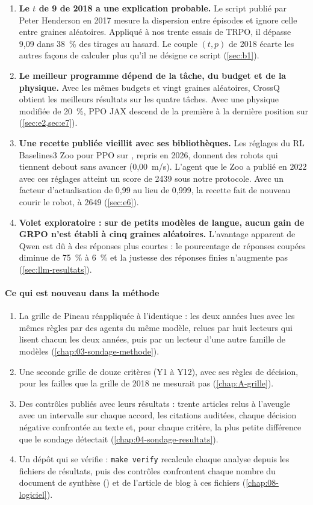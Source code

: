 \begin{enumerate}
  (\cref{sec:e1,sec:e4}).
  \item \textbf{Le $t$ de 9 de 2018 a une explication probable.} Le script publié par Peter Henderson
  en 2017 mesure la dispersion entre épisodes et ignore celle entre graines aléatoires. Appliqué à nos
  trente essais de TRPO, il dépasse 9,09 dans 38~\% des tirages au hasard. Le couple $(t, p)$ de 2018
  écarte les autres façons de calculer plus qu'il ne désigne ce script (\cref{sec:b1}).
  \item \textbf{Le meilleur programme dépend de la tâche, du budget et de la physique.} Avec les mêmes
  budgets et vingt graines aléatoires, CrossQ obtient les meilleurs résultats sur les quatre
  tâches. Avec une physique modifiée de 20~\%, PPO JAX descend de la première à la dernière
  position sur  (\cref{sec:e2,sec:e7}).
  \item \textbf{Une recette publiée vieillit avec ses bibliothèques.} Les réglages du RL Baselines3
  Zoo pour PPO sur , repris en 2026, donnent des robots qui tiennent debout sans avancer
  (0,00~m/s). L'agent que le Zoo a publié en 2022 avec ces réglages atteint un score de \num{2439}
  sous notre protocole. Avec un facteur d'actualisation de 0,99 au lieu de 0,999, la recette fait de
  nouveau courir le robot, à \num{2649} (\cref{sec:e6}).
  \item \textbf{Volet exploratoire : sur de petits modèles de langue, aucun gain de GRPO n'est établi à cinq graines aléatoires.}
  L'avantage apparent de Qwen est dû à des réponses plus courtes : le pourcentage de réponses coupées
  diminue de 75~\% à 6~\% et la justesse des réponses finies n'augmente pas (\cref{sec:llm-resultats}).
\end{enumerate}

\paragraph{Ce qui est nouveau dans la méthode}
\begin{enumerate}
  \item La grille de Pineau réappliquée à l'identique : les deux années lues avec les mêmes règles
  par des agents du même modèle, relues par huit lecteurs qui lisent chacun les deux années, puis par
  un lecteur d'une autre famille de modèles (\cref{chap:03-sondage-methode}).
  \item Une seconde grille de douze critères (Y1 à Y12), avec ses règles de décision,
  pour les failles que la grille de 2018 ne mesurait pas (\cref{chap:A-grille}).
  \item Des contrôles publiés avec leurs résultats : trente articles relus à l'aveugle avec un
  intervalle sur chaque accord, les citations auditées, chaque décision négative confrontée au texte
  et, pour chaque critère, la plus petite différence que le sondage détectait
  (\cref{chap:04-sondage-resultats}).
  \item Un dépôt qui se vérifie : \texttt{make verify} recalcule chaque analyse depuis les fichiers de
  résultats, puis des contrôles confrontent chaque nombre du document de synthèse
  () et de l'article de blog à ces fichiers (\cref{chap:08-logiciel}).
\end{enumerate}

